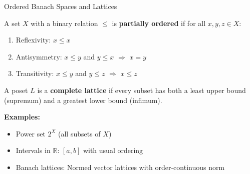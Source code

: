 \documentclass[aspectratio=169,10pt]{beamer}
\begin{document}
\begin{frame}{Ordered Banach Spaces and Lattices}
    \begin{definition}
        A set $X$ with a binary relation $\leq$ is \textbf{partially ordered} if for all $x,y,z \in X$:
        \begin{enumerate}
            \item Reflexivity: $x \leq x$
            \item Antisymmetry: $x \leq y$ and $y \leq x$ $\Rightarrow$ $x = y$
            \item Transitivity: $x \leq y$ and $y \leq z$ $\Rightarrow$ $x \leq z$
        \end{enumerate}
    \end{definition}

    \begin{definition}
        A poset $L$ is a \textbf{complete lattice} if every subset has both a least upper bound (supremum)
        and a greatest lower bound (infimum).
    \end{definition}

    \textbf{Examples:}
    \begin{itemize}
        \item Power set $2^X$ (all subsets of $X$)
        \item Intervals in $\mathbb{R}$: $[a,b]$ with usual ordering
        \item Banach lattices: Normed vector lattices with order-continuous norm
    \end{itemize}
\end{frame}
\end{document}
